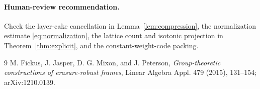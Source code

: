 \documentclass[11pt]{article}
\begin{document}
\paragraph{Human-review recommendation.}
Check the layer-cake cancellation in Lemma~\ref{lem:compression}, the
normalization estimate \eqref{eq:normalization}, the lattice count and isotonic
projection in Theorem~\ref{thm:explicit}, and the constant-weight-code packing.

\begin{thebibliography}{9}
M. Fickus, J. Jasper, D. G. Mixon, and J. Peterson,
\emph{Group-theoretic constructions of erasure-robust frames},
Linear Algebra Appl. 479 (2015), 131--154; arXiv:1210.0139.
\end{thebibliography}
\end{document}
